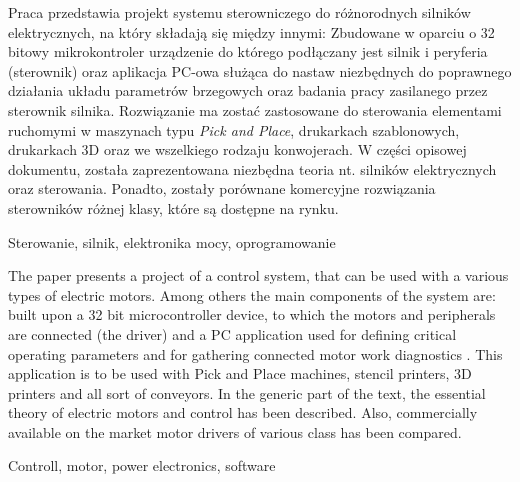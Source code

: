 \thispagestyle{empty}

Praca przedstawia projekt systemu sterowniczego do różnorodnych silników elektrycznych, na który składają się między innymi: Zbudowane w oparciu o 32 bitowy mikrokontroler urządzenie do którego podłączany jest silnik i peryferia (sterownik) oraz aplikacja PC-owa służąca do nastaw niezbędnych do poprawnego działania układu parametrów brzegowych oraz badania pracy zasilanego przez sterownik silnika. Rozwiązanie ma zostać zastosowane do sterowania elementami ruchomymi w maszynach typu {\it Pick and Place}, drukarkach szablonowych, drukarkach 3D oraz we wszelkiego rodzaju konwojerach. W części opisowej dokumentu, została zaprezentowana niezbędna teoria nt. silników elektrycznych oraz sterowania. Ponadto, zostały porównane komercyjne rozwiązania sterowników różnej klasy, które są dostępne na rynku.

Sterowanie, silnik, elektronika mocy, oprogramowanie

The paper presents a project of a control system, that can be used with a various types of electric motors. Among others the main components of the system are: built upon a 32 bit microcontroller device, to which the motors and peripherals are connected (the driver) and a PC application used for defining critical operating parameters and for gathering connected motor work diagnostics . This application is to be used with Pick and Place machines, stencil printers, 3D printers and all sort of conveyors. In the generic part of the text, the essential theory of electric motors and control has been described. Also, commercially available on the market  motor drivers of various class has been compared.

Controll, motor, power electronics, software


\clearpage
